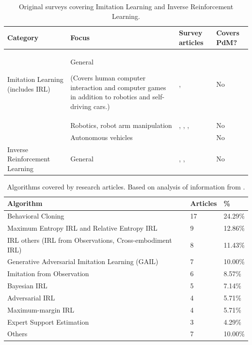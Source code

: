 \documentclass{article}
\begin{document}
\begingroup
\setlength{\tabcolsep}{6pt}
\begin{table}[h!]
	\renewcommand{\arraystretch}{1.5}
	\selectfont
	\begin{tabular}{L{2cm} L{5cm} L{4cm} L{2cm}}
		\midrule[0.01pt]
		\textbf{Category} & \textbf{Focus} & \textbf{Survey articles} & \textbf{Covers PdM?}\\ \midrule[0.01pt]
		
		Imitation Learning (includes IRL) & General \par(Covers human computer interaction and computer games in addition to robotics and self-driving cars.) & \citet{zare2024survey}, \citet{hussein2017survey} & No\\
		& Robotics, robot arm manipulation & \citet{Osa-2018}, \citet{fang2019survey}, \citet{tai2016survey}, \citet{schaal1999}  & No\\
		& Autonomous vehicles & \citet{le2022survey} & No\\
		\midrule[0.01pt]
		Inverse Reinforcement Learning & General & \citet{adams2022survey}, \citet{arora2021survey}, \citet{zhifei2012survey} & No\\
		\midrule[0.01pt]
	\end{tabular}
	\caption{Original surveys covering Imitation Learning and Inverse Reinforcement Learning.} \label{tbl:Surveys}
\end{table}
\endgroup

\begingroup
\setlength{\tabcolsep}{6pt}
\begin{table}[h!]
	\renewcommand{\arraystretch}{1.5}
	\selectfont
	\begin{tabular}{L{5cm} R{2cm} R{2cm}}
		\midrule[0.01pt]
		\textbf{Algorithm} & \textbf{Articles} & \textbf{\%} \\ \midrule[0.01pt]
		Behavioral Cloning & 17 & 24.29\%\\
		Maximum Entropy IRL and Relative Entropy IRL & 9 & 12.86\%\\
		IRL others (IRL from Observations, Cross-embodiment IRL) & 8 & 11.43\%\\
		Generative Adversarial Imitation Learning (GAIL) & 7 & 10.00\%\\
		Imitation from Observation & 6 & 8.57\%\\
		Bayesian IRL & 5 & 7.14\%\\
		Adversarial IRL & 4 & 5.71\%\\
		Maximum-margin IRL & 4 & 5.71\%\\
		Expert Support Estimation & 3 & 4.29\%\\
		Others & 7 & 10.00\%\\
		\midrule[0.01pt]
	\end{tabular}
	\caption{Algorithms covered by research articles. Based on analysis of information from \citet{zare2024survey}.} \label{tbl:ZareAlgos}
\end{table}
\endgroup
\end{document}

